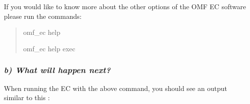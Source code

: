 \documentclass[letterpaper,10pt,english]{sphinxmanual}
\begin{document}
If you would like to know more about the other options of the OMF EC software please run the commands:
\begin{quote}

\begin{DUlineblock}{0em}
\item[] omf\_ec help
\item[] omf\_ec help exec
\end{DUlineblock}
\end{quote}


\subsubsection{\emph{b) What will happen next?}}
\label{omf_example:b-what-will-happen-next}
\begin{DUlineblock}{0em}
\item[] When running the EC with the above command, you should see an output similar to this :
\end{DUlineblock}
\end{document}
